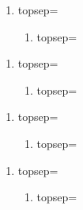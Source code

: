 ﻿\documentclass{article}
\begin{document}
    \begin{minipage}[t]{.25\textwidth}
        \begin{enumerate}
            \item topsep=\the\topsep
            \begin{enumerate}
                \item topsep=\the\topsep
            \end{enumerate}
        \end{enumerate}
    
        \begin{enumerate}
            \item topsep=\the\topsep
            \begin{enumerate}
                \item topsep=\the\topsep
            \end{enumerate}
        \end{enumerate} %
    
        \begin{enumerate}
            \item topsep=\the\topsep
            \begin{enumerate}
                \item topsep=\the\topsep
            \end{enumerate}
        \end{enumerate} %
    
        \begin{enumerate}
            \item topsep=\the\topsep
            \begin{enumerate}
                \item topsep=\the\topsep
            \end{enumerate}
        \end{enumerate} %
    \end{minipage}\hfill
\end{document}

